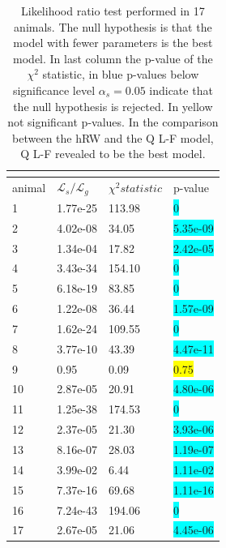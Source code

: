 \begin{table}[H]
\begin{tabular}{|p{2.5cm}|p{2.5cm}|p{2.5cm}|p{2.5cm}|}
\hline
\multicolumn{4}{|c|}{\cellcolor{blue!25}{Comparison between hRW model and Q L-F model (Likelihood ratio test)}}\\
\hline
 \cellcolor[gray]{0.9} animal & \cellcolor[gray]{0.9} $\mathcal{L}_s / \mathcal{L}_g$& \cellcolor[gray]{0.9} $\chi^2 statistic$ & \cellcolor[gray]{0.9} p-value\\
 \hline
 1& 1.77e-25 & 113.98 & \colorbox{cyan}{0}\\
 \hline
 2& 4.02e-08 & 34.05 & \colorbox{cyan}{5.35e-09}\\
 \hline
 3 & 1.34e-04 & 17.82 & \colorbox{cyan}{2.42e-05}\\
 \hline
 4 & 3.43e-34 & 154.10 & \colorbox{cyan}{0}\\
 \hline
 5 & 6.18e-19 & 83.85 & \colorbox{cyan}{0}\\
 \hline
 6 & 1.22e-08 & 36.44 & \colorbox{cyan}{1.57e-09}\\
 \hline
 7 & 1.62e-24 & 109.55 & \colorbox{cyan}{0}\\
 \hline
 8 & 3.77e-10 & 43.39 & \colorbox{cyan}{4.47e-11}\\
 \hline
 9 & 0.95 & 0.09 & \colorbox{yellow}{0.75}\\
 \hline
 10 & 2.87e-05 & 20.91 & \colorbox{cyan}{4.80e-06}\\
 \hline
 11 & 1.25e-38 & 174.53 & \colorbox{cyan}{0}\\
 \hline
 12 & 2.37e-05 & 21.30 & \colorbox{cyan}{3.93e-06}\\
 \hline
 13 & 8.16e-07 & 28.03 & \colorbox{cyan}{1.19e-07}\\
 \hline
 14 & 3.99e-02 & 6.44 & \colorbox{cyan}{1.11e-02}\\
 \hline
 15 & 7.37e-16 & 69.68 & \colorbox{cyan}{1.11e-16}\\
 \hline
 16 & 7.24e-43 & 194.06 & \colorbox{cyan}{0}\\
 \hline
 17 & 2.67e-05 & 21.06 & \colorbox{cyan}{4.45e-06}\\
 \hline
\end{tabular}
\caption{Likelihood ratio test performed in 17 animals. The null hypothesis is that the model with fewer parameters is the best model. In last column the p-value of the $\chi^2$ statistic, in blue p-values below significance level $\alpha_s=0.05$ indicate that the null hypothesis is rejected. In yellow not significant p-values. In the comparison between the hRW and the Q L-F model, Q L-F revealed to be the best model.}
\label{tab:ModelComparison}
\end{table}
